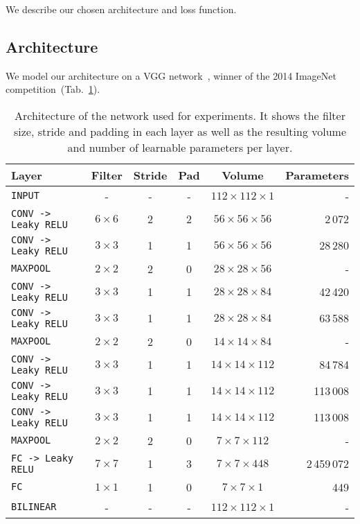 We describe our chosen architecture and loss function.

\subsection{Architecture}
We model our architecture on a VGG network~\cite{Simonyan2014}, winner of the 2014 ImageNet competition~(Tab.~\ref{tab:convNetArchitecture}).
\begin{table}[h]
	\centering
	\begin{tabular}{lccccr}
	\hline
	\textbf{Layer} & \textbf{Filter} & \textbf{Stride} &\textbf{Pad} & \textbf{Volume} & \textbf{Parameters} \\
	\hline
	\texttt{INPUT}	& -	& - & - & $112 \times 112 \times 1$ & -\\
	\texttt{CONV -> Leaky RELU} & $6 \times 6$ & 2 & 2 & $56 \times 56 \times 56$ & 2\,072\\
	\texttt{CONV -> Leaky RELU} & $3 \times 3$ & 1 & 1 & $56 \times 56 \times 56$ & 28\,280\\
	\texttt{MAXPOOL} & $2 \times 2$ & 2 & 0 & $28 \times 28 \times 56$ & -\\
	\texttt{CONV -> Leaky RELU} & $3 \times 3$ & 1 & 1 & $28 \times 28 \times 84$ & 42\,420\\
	\texttt{CONV -> Leaky RELU} & $3 \times 3$ & 1 & 1 & $28 \times 28 \times 84$ & 63\,588\\
	\texttt{MAXPOOL} & $2 \times 2$ & 2 & 0 & $14 \times 14 \times 84$ & -\\
	\texttt{CONV -> Leaky RELU} & $3 \times 3$ & 1 & 1 & $14 \times 14 \times 112$ & 84\,784\\
	\texttt{CONV -> Leaky RELU} & $3 \times 3$ & 1 & 1 & $14 \times 14 \times 112$ & 113\,008\\
	\texttt{CONV -> Leaky RELU} & $3 \times 3$ & 1 & 1 & $14 \times 14 \times 112$ & 113\,008\\
	\texttt{MAXPOOL} & $2 \times 2$ & 2 & 0 & $7 \times 7 \times 112$ & -\\
	\texttt{FC -> Leaky RELU} & $7 \times 7$ & 1 & 3 & $7 \times 7 \times 448$ & 2\,459\,072\\
	\texttt{FC} & $1 \times 1$ & 1 & 0 & $7 \times 7 \times 1$ & 449 \\
	\texttt{BILINEAR} & - & - & - & $112 \times 112 \times 1$ & -\\
	\hline
	\end{tabular}
	\caption[Selected convolutional network architecture]{Architecture of the network used for experiments. It shows the filter size, stride and padding in each layer as well as the resulting volume and number of learnable parameters per layer.}
	\label{tab:convNetArchitecture}
\end{table}



